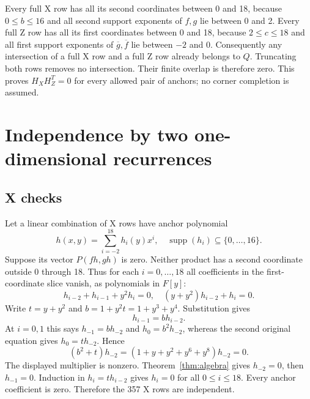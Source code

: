 \documentclass{article}
\DeclareMathOperator{\supp}{supp}
\begin{document}
Every full X row has all its second coordinates between 0 and 18, because
\(0 \le b \le 16\) and all second support exponents of \(f, g\) lie between 0
and 2. Every full Z row has all its first coordinates between 0 and 18,
because \(2 \le c \le 18\) and all first support exponents of
\(\overline{g}, \overline{f}\) lie between \(-2\) and 0. Consequently any
intersection of a full X row and a full Z row already belongs to \(Q\).
Truncating both rows removes no intersection. Their finite overlap is
therefore zero. This proves \(H_X H_Z^T = 0\) for every allowed pair of
anchors; no corner completion is assumed.

\section{Independence by two one-dimensional recurrences}\label{sec:independence}

\subsection{X checks}\label{sec:x-checks}

Let a linear combination of X rows have anchor polynomial
\begin{equation}
  h(x,y) = \sum_{i=-2}^{18} h_i(y) x^i, \quad
  \supp(h_i) \subseteq \{0, \dots, 16\}.
\end{equation}
Suppose its vector \(P(fh, gh)\) is zero. Neither product has a second
coordinate outside 0 through 18. Thus for each \(i = 0, \dots, 18\) all
coefficients in the first-coordinate slice vanish, as polynomials in \(F[y]\):
\begin{equation}
  h_{i-2} + h_{i-1} + y^2 h_i = 0, \quad (y + y^2) h_{i-2} + h_i = 0.
\end{equation}
Write \(t = y + y^2\) and \(b = 1 + y^2 t = 1 + y^3 + y^4\). Substitution gives
\begin{equation}
  h_{i-1} = b h_{i-2}.
\end{equation}
At \(i = 0, 1\) this says \(h_{-1} = b h_{-2}\) and \(h_0 = b^2 h_{-2}\),
whereas the second original equation gives \(h_0 = t h_{-2}\). Hence
\begin{equation}
  (b^2 + t) h_{-2} = (1 + y + y^2 + y^6 + y^8) h_{-2} = 0.
\end{equation}
The displayed multiplier is nonzero. Theorem~\ref{thm:algebra} gives
\(h_{-2} = 0\), then \(h_{-1} = 0\). Induction in \(h_i = t h_{i-2}\) gives
\(h_i = 0\) for all \(0 \le i \le 18\). Every anchor coefficient is zero.
Therefore the 357 X rows are independent.
\end{document}

